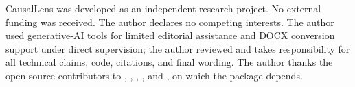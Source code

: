 \documentclass[article]{jss}
\begin{document}
CausalLens was developed as an independent research project. No external
funding was received. The author declares no competing interests. The author
used generative-AI tools for limited editorial assistance and DOCX conversion
support under direct supervision; the author reviewed and takes responsibility
for all technical claims, code, citations, and final wording. The author thanks the open-source contributors to
, , , , and
, on which the package depends.



\end{document}
